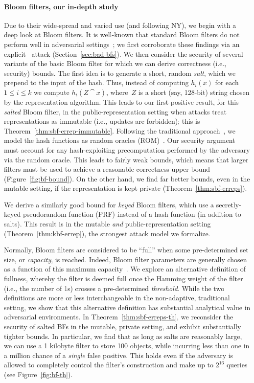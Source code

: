 \paragraph{Bloom filters, our in-depth study}
Due to their wide-spread and varied use (and following NY), we begin
with a deep look at Bloom filters.
%
It is well-known that standard Bloom filters do not perform well in adversarial
settings~\cite{naor2015bloom,gerbet2015power}; we first corroborate these
findings via an explicit \erreps\ attack (Section~\ref{sec:bad-bfs}).
%
We then consider the security of several variants of the basic Bloom
filter for which we can derive correctness (i.e., security) bounds.
%
The first idea is to generate a short, random \emph{salt}, which we prepend to
the input of the hash. Thus, instead of computing $h_i(x)$ for each $1\leq i
\leq k$ we compute $h_i(Z \cat x)$, where~$Z$ is a short (say, 128-bit) string
chosen by the representation algorithm.
%
This leads to our first positive result, for this \emph{salted} Bloom filter, in the
public-representation setting when attacks treat representations as
immutable (i.e., updates are forbidden); this is Theorem~\ref{thm:sbf-errep-immutable}.
%
Following the traditional approach~\cite{broder2004network}, we model
the hash functions as random oracles 
(ROM)~\cite{BR93}.  Our security argument must account for any hash-exploiting
precomputation performed by the adversary via the random oracle. This leads to
fairly weak bounds, which means that larger filters must be used to achieve a
reasonable correctness upper bound (Figure~\ref{fig:bf-bound}). 
%
On the other
hand, we find far better bounds, even in the mutable setting, if the
representation is kept private (Theorem~\ref{thm:sbf-erreps}). 

We derive a similarly good bound for \emph{keyed} Bloom filters, which use a
secretly-keyed pseudorandom function (PRF) instead of a hash function
(in addition to salts). This result is in the mutable \emph{and}
public-representation setting (Theorem~\ref{thm:kbf-errep}), the
strongest attack model we formalize.

Normally, Bloom filters are considered to be ``full'' when some
pre-determined set size, or
\emph{capacity}, is reached.  Indeed, Bloom filter parameters are generally chosen
as a function of this maximum capacity~\cite{kirsch2006less}.
%
We explore an alternative definition of fullness, whereby the filter is deemed full
once the Hamming weight of the filter (i.e., the number of 1s) crosses a
pre-determined \emph{threshold}.  While the two definitions are more or
less interchangeable in the non-adaptive, traditional setting, we show
that this alternative definition has substantial
analytical value in adversarial environments.  In
Theorem~\ref{thm:sbf-erreps-th}, we reconsider the security of salted
BFs in the mutable, private setting, and exhibit substantially tighter bounds. In
particular, we find that as long as salts are reasonably large, we can use
a 1 kilobyte filter to store 100 objects, while incurring less than one in a million
chance of a \emph{single} false positive.  This holds even if the adversary is allowed
to completely control the filter's construction and make up to $2^{16}$ queries
(see Figure~\ref{fig:bf-th}).


